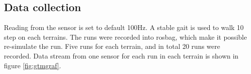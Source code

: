 \documentclass[USenglish]{ifimaster}  %
\begin{document}
\subsection{Data collection}
Reading from the sensor is set to default 100Hz. A stable gait is used to walk 10 step on each terrains. The runs were recorded into rosbag, which make it possible re-simulate the run. Five runs for each terrain, and in total 20 runs were recorded. Data stream from one sensor for each run in each terrain is shown in figure \ref{fig:gtmgraf}.
	

\end{document}
